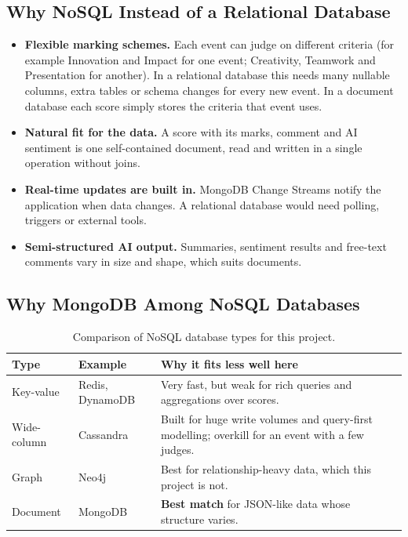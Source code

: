 \documentclass[11pt,a4paper]{article}
\begin{document}
\subsection{Why NoSQL Instead of a Relational Database}
\begin{itemize}
  \item \textbf{Flexible marking schemes.} Each event can judge on different criteria (for example Innovation and Impact for one event; Creativity, Teamwork and Presentation for another). In a relational database this needs many nullable columns, extra tables or schema changes for every new event. In a document database each score simply stores the criteria that event uses.
  \item \textbf{Natural fit for the data.} A score with its marks, comment and AI sentiment is one self-contained document, read and written in a single operation without joins.
  \item \textbf{Real-time updates are built in.} MongoDB Change Streams notify the application when data changes. A relational database would need polling, triggers or external tools.
  \item \textbf{Semi-structured AI output.} Summaries, sentiment results and free-text comments vary in size and shape, which suits documents.
\end{itemize}

\subsection{Why MongoDB Among NoSQL Databases}
\begin{table}[H]
\centering
\begin{tabularx}{\textwidth}{l l X}
\toprule
\textbf{Type} & \textbf{Example} & \textbf{Why it fits less well here} \\
\midrule
Key-value   & Redis, DynamoDB & Very fast, but weak for rich queries and aggregations over scores. \\
Wide-column & Cassandra       & Built for huge write volumes and query-first modelling; overkill for an event with a few judges. \\
Graph       & Neo4j           & Best for relationship-heavy data, which this project is not. \\
Document    & MongoDB         & \textbf{Best match} for JSON-like data whose structure varies. \\
\bottomrule
\end{tabularx}
\caption{Comparison of NoSQL database types for this project.}
\end{table}
\end{document}
